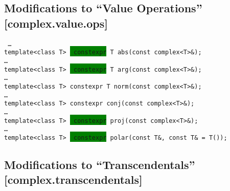 \documentclass[prd,twocolumn,amsmath,amssymb,nofootinbib,eqsecnum]{revtex4-1}
\newcommand{\code}[1]{{\tt #1}}
\newcommand{\highlight}[1]{\colorbox{green}{\!\!\!\! #1}}
\begin{document}
\subsection{Modifications to ``Value Operations'' [complex.value.ops]}

\code{
	\ldots\\

	template<class T> \highlight{constexpr} T abs(const complex<T>\&);\\

 	\ldots\\

	template<class T> \highlight{constexpr} T arg(const complex<T>\&);\\

	\ldots\\

	template<class T> constexpr T norm(const complex<T>\&);\\

	\ldots\\

	template<class T> constexpr conj(const complex<T>\&);\\

	\ldots\\

	template<class T> \highlight{constexpr} proj(const complex<T>\&);\\

	\ldots\\

	template<class T> \highlight{constexpr} polar(const T\&, const T\& = T());	
}

\subsection{Modifications to ``Transcendentals'' [complex.transcendentals]}
\end{document}
